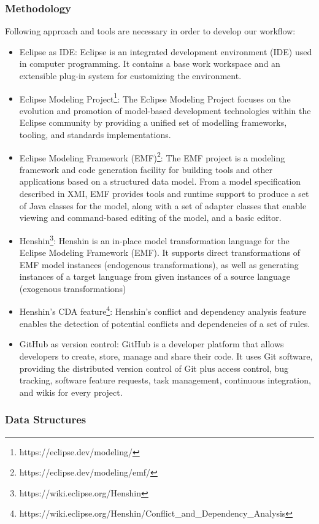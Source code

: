 \subsubsection*{Methodology}
Following approach and tools are necessary in order to develop our workflow:
\begin{itemize}
	\item Eclipse as IDE: Eclipse is an integrated development environment (IDE) used in computer programming. It contains a base work workspace and an extensible plug-in system for customizing the environment.
	\item Eclipse Modeling Project\footnote{https://eclipse.dev/modeling/}: The Eclipse Modeling Project focuses on the evolution and promotion of model-based development technologies within the Eclipse community by providing a unified set of modelling frameworks, tooling, and standards implementations.
	\item Eclipse Modeling Framework (EMF)\footnote{https://eclipse.dev/modeling/emf/}: The EMF project is a modeling framework and code generation facility for building tools and other applications based on a structured data model. From a model specification described in XMI, EMF provides tools and runtime support to produce a set of Java classes for the model, along with a set of adapter classes that enable viewing and command-based editing of the model, and a basic editor.
	\item Henshin\footnote{https://wiki.eclipse.org/Henshin}: Henshin is an in-place model transformation language for the Eclipse Modeling Framework (EMF). It supports direct transformations of EMF model instances (endogenous transformations), as well as generating instances of a target language from given instances of a source language (exogenous transformations)
	\item Henshin's CDA feature\footnote{https://wiki.eclipse.org/Henshin/Conflict\_and\_Dependency\_Analysis}: Henshin's conflict and dependency analysis feature enables the detection of potential conflicts and dependencies of a set of rules.
	\item GitHub as version control: GitHub is a developer platform that allows developers to create, store, manage and share their code. It uses Git software, providing the distributed version control of Git plus access control, bug tracking, software feature requests, task management, continuous integration, and wikis for every project.
\end{itemize} 
\subsubsection*{Data Structures}
